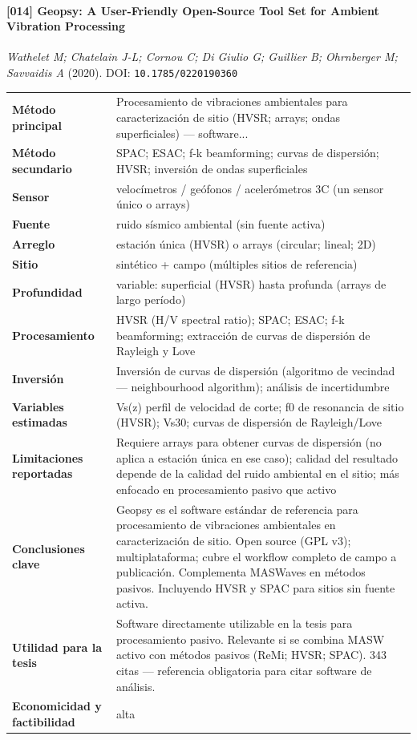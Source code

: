 \paragraph{[014] Geopsy: A User-Friendly Open-Source Tool Set for Ambient Vibration Processing} \emph{Wathelet M; Chatelain J-L; Cornou C; Di Giulio G; Guillier B; Ohrnberger M; Savvaidis A} (2020).
{\scriptsize DOI: \texttt{10.1785/0220190360}}

\begin{center}\scriptsize
\begin{tabularx}{\textwidth}{@{}>{\bfseries}p{3.3cm} X@{}}
\toprule
M\'etodo principal & Procesamiento de vibraciones ambientales para caracterización de sitio (HVSR; arrays; ondas superficiales) --- software... \\
M\'etodo secundario & SPAC; ESAC; f-k beamforming; curvas de dispersión; HVSR; inversión de ondas superficiales \\
Sensor & velocímetros / geófonos / acelerómetros 3C (un sensor único o arrays) \\
Fuente & ruido sísmico ambiental (sin fuente activa) \\
Arreglo & estación única (HVSR) o arrays (circular; lineal; 2D) \\
Sitio & sintético + campo (múltiples sitios de referencia) \\
Profundidad & variable: superficial (HVSR) hasta profunda (arrays de largo período) \\
Procesamiento & HVSR (H/V spectral ratio); SPAC; ESAC; f-k beamforming; extracción de curvas de dispersión de Rayleigh y Love \\
Inversi\'on & Inversión de curvas de dispersión (algoritmo de vecindad --- neighbourhood algorithm); análisis de incertidumbre \\
Variables estimadas & Vs(z) perfil de velocidad de corte; f0 de resonancia de sitio (HVSR); Vs30; curvas de dispersión de Rayleigh/Love \\
Limitaciones reportadas & Requiere arrays para obtener curvas de dispersión (no aplica a estación única en ese caso); calidad del resultado depende de la calidad del ruido ambiental en el sitio; más enfocado en procesamiento pasivo que activo \\
Conclusiones clave & Geopsy es el software estándar de referencia para procesamiento de vibraciones ambientales en caracterización de sitio. Open source (GPL v3); multiplataforma; cubre el workflow completo de campo a publicación. Complementa MASWaves en métodos pasivos. Incluyendo HVSR y SPAC para sitios sin fuente activa. \\
Utilidad para la tesis & Software directamente utilizable en la tesis para procesamiento pasivo. Relevante si se combina MASW activo con métodos pasivos (ReMi; HVSR; SPAC). 343 citas --- referencia obligatoria para citar software de análisis. \\
Economicidad y factibilidad & alta \\
\bottomrule
\end{tabularx}
\end{center}

